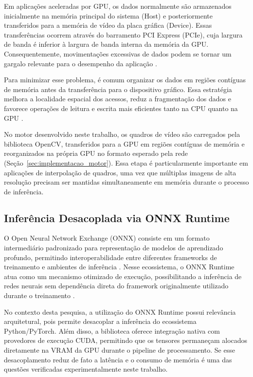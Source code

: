\documentclass[
    12pt,                %
    openright,           %
    oneside,             %
    a4paper,             %
    english,             %
    brazil               %
]{abntex2}
\begin{document}
Em aplicações aceleradas por GPU, os dados normalmente são armazenados inicialmente na memória principal do sistema (Host) e posteriormente transferidos para a memória de vídeo da placa gráfica (Device). Essas transferências ocorrem através do barramento PCI Express (PCIe), cuja largura de banda é inferior à largura de banda interna da memória da GPU. Consequentemente, movimentações excessivas de dados podem se tornar um gargalo relevante para o desempenho da aplicação \cite{NvidiaCUDA2025}.

Para minimizar esse problema, é comum organizar os dados em regiões contíguas de memória antes da transferência para o dispositivo gráfico. Essa estratégia melhora a localidade espacial dos acessos, reduz a fragmentação dos dados e favorece operações de leitura e escrita mais eficientes tanto na CPU quanto na GPU \cite{Kirk2023}.

No motor desenvolvido neste trabalho, os quadros de vídeo são carregados pela biblioteca OpenCV, transferidos para a GPU em regiões contíguas de memória e reorganizados na própria GPU no formato esperado pela rede (Seção~\ref{sec:implementacao_motor}). Essa etapa é particularmente importante em aplicações de interpolação de quadros, uma vez que múltiplas imagens de alta resolução precisam ser mantidas simultaneamente em memória durante o processo de inferência.


\subsection{Inferência Desacoplada via ONNX Runtime}

O Open Neural Network Exchange (ONNX) consiste em um formato intermediário padronizado para representação de modelos de aprendizado profundo, permitindo interoperabilidade entre diferentes frameworks de treinamento e ambientes de inferência \cite{Bai2019ONNX}. Nesse ecossistema, o ONNX Runtime atua como um mecanismo otimizado de execução, possibilitando a inferência de redes neurais sem dependência direta do framework originalmente utilizado durante o treinamento \cite{ONNX2026}.

No contexto desta pesquisa, a utilização do ONNX Runtime possui relevância arquitetural, pois permite desacoplar a inferência do ecossistema Python/PyTorch. Além disso, a biblioteca oferece integração nativa com provedores de execução CUDA, permitindo que os tensores permaneçam alocados diretamente na VRAM da GPU durante o pipeline de processamento. Se esse desacoplamento reduz de fato a latência e o consumo de memória é uma das questões verificadas experimentalmente neste trabalho.
\end{document}
